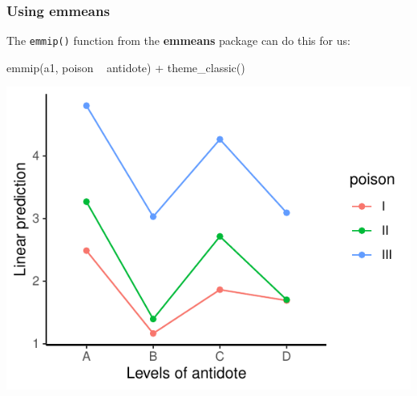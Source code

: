 \documentclass[a4paper]{article}
\begin{document}
\subsubsection{Using emmeans}
The \lstinline|emmip()| function from the \textbf{emmeans} package can do this for us:\\
\begin{minipage}[t]{0.49\textwidth}
\begin{Schunk}
\begin{Sinput}
emmip(a1, poison ~ antidote) +
  theme_classic()
\end{Sinput}


{\centering \includegraphics[width=\maxwidth]{figure/listings-unnamed-chunk-318-1} 

}

\end{Schunk}
\end{minipage}
\hspace{0.02\textwidth}
\end{document}
